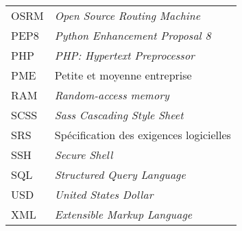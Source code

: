 \begin{longtable}{lp{5in}}
OSRM      & \textit{Open Source Routing Machine}\\
PEP8      & \textit{Python Enhancement Proposal 8}\\
PHP       & \textit{PHP: Hypertext Preprocessor}\\
PME       & Petite et moyenne entreprise\\
RAM       & \textit{Random-access memory}\\
SCSS      & \textit{Sass Cascading Style Sheet}\\
SRS       & Spécification des exigences logicielles\\
SSH       & \textit{Secure Shell}\\
SQL       & \textit{Structured Query Language}\\
USD       & \textit{United States Dollar}\\
XML       & \textit{Extensible Markup Language}\\

\end{longtable}
